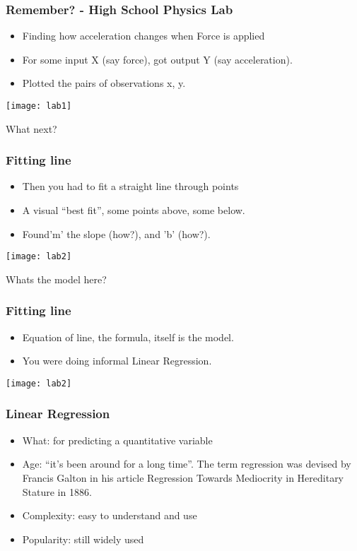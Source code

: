 \begin{frame}[fragile]\frametitle{Remember? - High School Physics Lab}
\begin{itemize}
\item Finding how acceleration changes when Force is applied
\item For some input X (say force), got output Y (say acceleration).
\item Plotted the pairs of observations x, y.
\end{itemize}
\begin{center}
\texttt{[image: lab1]}
\end{center}
What next?
\end{frame}

\begin{frame}[fragile]\frametitle{Fitting line}
\begin{itemize}
\item Then you had to fit a straight line through points
\item A visual ``best fit'', some points above, some below.
\item Found'm' the slope (how?), and 'b' (how?). 
\end{itemize}
\begin{center}
\texttt{[image: lab2]}
\end{center}
Whats the model here?
\end{frame}


\begin{frame}[fragile]\frametitle{Fitting line}
\begin{itemize}
\item Equation of line, the formula, itself is the model.
\item You were doing informal Linear Regression.
\end{itemize}
\begin{center}
\texttt{[image: lab2]}
\end{center}
\end{frame}


\begin{frame}[fragile]\frametitle{Linear Regression}
\begin{itemize}
\item What: for predicting a quantitative variable
\item Age: ``it's been around for a long time''. The term regression was devised by Francis Galton in his article 
Regression Towards Mediocrity in Hereditary Stature in 1886. 
\item Complexity: easy to understand and use
\item Popularity: still widely used
\end{itemize}
\end{frame}


